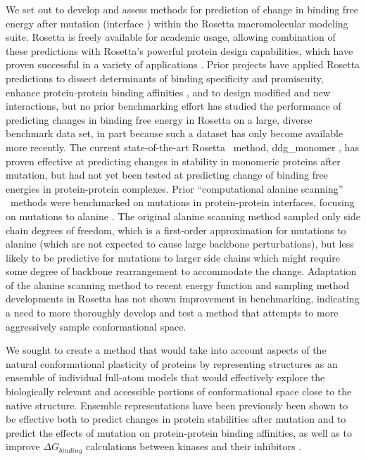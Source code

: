 We set out to develop and assess methods for prediction of change in binding free energy after mutation (interface \ddg) within the Rosetta macromolecular modeling suite. Rosetta is freely available for academic usage, allowing combination of these predictions with Rosetta's powerful protein design capabilities, which have proven successful in a variety of applications \cite{kaufmann_practically_2010}. %
Prior projects have applied Rosetta predictions to
dissect determinants of binding specificity and promiscuity\cite{boulanger_convergent_2003,mcfarland_symmetry_2003},
enhance protein-protein binding affinities \cite{sammond_structure-based_2007,song_rational_2006},
and to design modified\cite{kortemme_computational_2004,kapp_control_2012}
and new interactions\cite{chevalier_design_2002,fleishman_computational_2011,chevalier_massively_2017}, but no prior benchmarking effort has studied the performance of predicting changes in binding free energy in Rosetta on a large, diverse benchmark data set, in part because such a dataset has only become available more recently.
The current state-of-the-art Rosetta \ddg\ method,  ddg\_monomer \cite{kellogg_role_2011}, has proven effective at predicting changes in stability in monomeric proteins after mutation, but had not yet been tested at predicting change of binding free energies in protein-protein complexes.
Prior ``computational alanine scanning'' \ddg\ methods were benchmarked on mutations in protein-protein interfaces, focusing on mutations to alanine \cite{kortemme_simple_2002,kortemme_computational_2004,conchuir_web_2015}.
The original alanine scanning method sampled only side chain degrees of freedom, which is a first-order approximation for mutations to alanine (which are not expected to cause large backbone perturbations\cite{cunningham_high-resolution_1989}), but less likely to be predictive for mutations to larger side chains which might require some degree of backbone rearrangement to accommodate the change.
Adaptation of the alanine scanning method to recent energy function and sampling method developments in Rosetta has not shown improvement in benchmarking\cite{conchuir_web_2015}, indicating a need to more thoroughly develop and test a method that attempts to more aggressively sample conformational space.

We sought to create a method that would take into account aspects of the natural conformational plasticity of proteins by representing structures as an ensemble of individual full-atom models that would effectively explore the biologically relevant and accessible portions of conformational space close to the native structure.
Ensemble representations have been previously been shown to be effective both to predict changes in protein stabilities after mutation and to predict the effects of mutation on protein-protein binding affinities\cite{benedix_predicting_2009}, as well as to improve $\Delta G_{binding}$ calculations between kinases and their inhibitors \cite{araki_effect_2016}.

